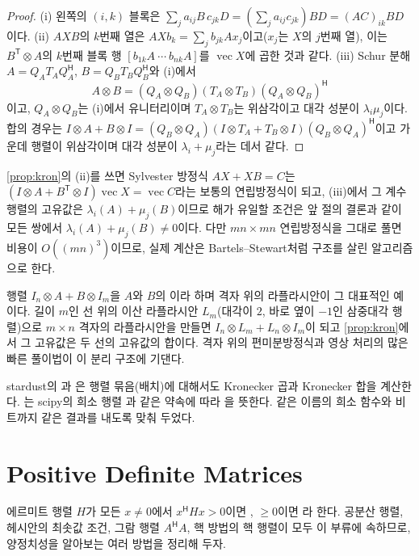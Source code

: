 \begin{proof}
(i) 왼쪽의 $(i,k)$ 블록은 $\sum_ja_{ij}B\,c_{jk}D=(\sum_ja_{ij}c_{jk})BD=(AC)_{ik}BD$이다. (ii) $AXB$의 $k$번째 열은 $AXb_k=\sum_jb_{jk}Ax_j$이고($x_j$는 $X$의 $j$번째 열), 이는 $B^{\mathsf T}\otimes A$의 $k$번째 블록 행 $[b_{1k}A\ \cdots\ b_{nk}A]$를 $\operatorname{vec}X$에 곱한 것과 같다. (iii) Schur 분해 $A=Q_AT_AQ_A^{\mathsf H}$, $B=Q_BT_BQ_B^{\mathsf H}$와 (i)에서
\[
A\otimes B=(Q_A\otimes Q_B)(T_A\otimes T_B)(Q_A\otimes Q_B)^{\mathsf H}
\]
이고, $Q_A\otimes Q_B$는 (i)에서 유니터리이며 $T_A\otimes T_B$는 위삼각이고 대각 성분이 $\lambda_i\mu_j$이다. 합의 경우는 $I\otimes A+B\otimes I=(Q_B\otimes Q_A)(I\otimes T_A+T_B\otimes I)(Q_B\otimes Q_A)^{\mathsf H}$이고 가운데 행렬이 위삼각이며 대각 성분이 $\lambda_i+\mu_j$라는 데서 같다.
\end{proof}

\cref{prop:kron}의 (ii)를 쓰면 Sylvester 방정식 $AX+XB=C$는 $(I\otimes A+B^{\mathsf T}\otimes I)\operatorname{vec}X=\operatorname{vec}C$라는 보통의 연립방정식이 되고, (iii)에서 그 계수행렬의 고유값은 $\lambda_i(A)+\mu_j(B)$이므로 해가 유일할 조건은 앞 절의 결론과 같이 모든 쌍에서 $\lambda_i(A)+\mu_j(B)\ne0$이다. 다만 $mn\times mn$ 연립방정식을 그대로 풀면 비용이 $O((mn)^3)$이므로, 실제 계산은 Bartels--Stewart처럼 구조를 살린 알고리즘으로 한다.

행렬 $I_n\otimes A+B\otimes I_m$을 $A$와 $B$의 이라 하며 격자 위의 라플라시안이 그 대표적인 예이다. 길이 $m$인 선 위의 이산 라플라시안 $L_m$(대각이 $2$, 바로 옆이 $-1$인 삼중대각 행렬)으로 $m\times n$ 격자의 라플라시안을 만들면 $I_n\otimes L_m+L_n\otimes I_m$이 되고 \cref{prop:kron}에서 그 고유값은 두 선의 고유값의 합이다. 격자 위의 편미분방정식과 영상 처리의 많은 빠른 풀이법이 이 분리 구조에 기댄다.

\begin{instardust}
stardust의 과 은 행렬 묶음(배치)에 대해서도 Kronecker 곱과 Kronecker 합을 계산한다. 는 scipy의 희소 행렬 과 같은 약속에 따라 을 뜻한다. 같은 이름의 희소 함수와 비트까지 같은 결과를 내도록 맞춰 두었다.
\end{instardust}

\section{Positive Definite Matrices}
\label{sec:pd}

에르미트 행렬 $H$가 모든 $x\ne0$에서 $x^{\mathsf H}Hx>0$이면 , $\ge0$이면 라 한다. 공분산 행렬, 헤시안의 최솟값 조건, 그람 행렬 $A^{\mathsf H}A$, 핵 방법의 핵 행렬이 모두 이 부류에 속하므로, 양정치성을 알아보는 여러 방법을 정리해 두자.

